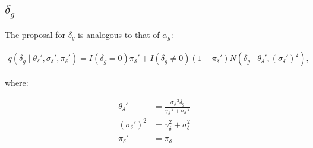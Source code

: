 \documentclass{article}\usepackage{graphicx, color}
\begin{document}
\begin{flushleft}





\subsection{$\delta_g$}

The proposal for $\delta_g$ is analogous to that of $\alpha_g$:


\begin{align*}
q(\delta_g \mid \theta_\delta', \sigma_\delta', \pi_\delta') = I(\delta_g = 0) \pi_\delta'  + I(\delta_g \ne 0) (1 - \pi_\delta') N(\delta_g \mid \theta_\delta', (\sigma_\delta')^2),
\end{align*}

where:

\begin{align*}
\theta_\delta' &=  \frac{ \sigma_\delta^{-2} \delta_g }{\gamma_\delta^{-2} + \sigma_\delta^{-2}} \\
(\sigma_\delta')^2 &= \gamma_\delta^2 + \sigma_\delta^2 \\
\pi_\delta' &= \pi_\delta
\end{align*}


\end{flushleft}
\end{document}
